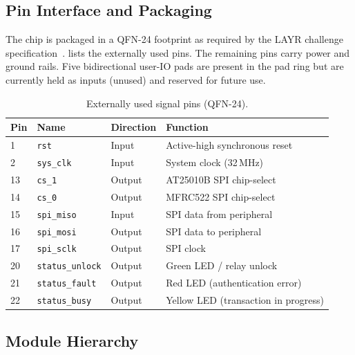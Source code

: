 \documentclass[manuscript,screen,nonacm]{acmart}
\begin{document}
\subsection{Pin Interface and Packaging}
\label{sec:arch:pins}

The chip is packaged in a QFN-24 footprint as required by the LAYR
challenge specification~\cite{ocdc_layr}.
 lists the externally used pins.
The remaining pins carry power and ground rails.
Five bidirectional user-IO pads are present in the pad ring but are
currently held as inputs (unused) and reserved for future use.

\begin{table}[ht]
  \caption{Externally used signal pins (QFN-24).}
  \label{tab:pins}
  \centering
  \begin{tabular}{llll}
    \toprule
    Pin & Name & Direction & Function \\
    \midrule
    1  & \texttt{rst}          & Input  & Active-high synchronous reset \\
    2  & \texttt{sys\_clk}     & Input  & System clock (32\,MHz) \\
    13 & \texttt{cs\_1}        & Output & AT25010B SPI chip-select \\
    14 & \texttt{cs\_0}        & Output & MFRC522 SPI chip-select \\
    15 & \texttt{spi\_miso}    & Input  & SPI data from peripheral \\
    16 & \texttt{spi\_mosi}    & Output & SPI data to peripheral \\
    17 & \texttt{spi\_sclk}    & Output & SPI clock \\
    20 & \texttt{status\_unlock} & Output & Green LED / relay unlock \\
    21 & \texttt{status\_fault}  & Output & Red LED (authentication error) \\
    22 & \texttt{status\_busy}   & Output & Yellow LED (transaction in progress) \\
    \bottomrule
  \end{tabular}
\end{table}

\subsection{Module Hierarchy}
\label{sec:arch:hier}
\end{document}
